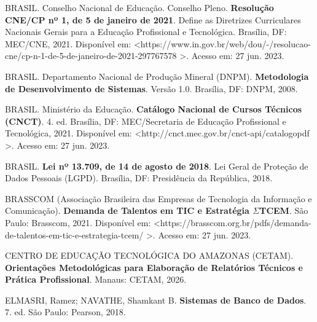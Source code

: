 \documentclass[12pt,a4paper]{article}
\begin{document}
\vspace{0.5cm}

\noindent BRASIL. Conselho Nacional de Educação. Conselho Pleno. \textbf{Resolução CNE/CP nº 1, de 5 de janeiro de 2021}. Define as Diretrizes Curriculares Nacionais Gerais para a Educação Profissional e Tecnológica. Brasília, DF: MEC/CNE, 2021. Disponível em: \textless https://www.in.gov.br/web/dou/-/resolucao-cne/cp-n-1-de-5-de-janeiro-de-2021-297767578 \textgreater. Acesso em: 27 jun. 2023.

\vspace{0.5cm}

\noindent BRASIL. Departamento Nacional de Produção Mineral (DNPM). \textbf{Metodologia de Desenvolvimento de Sistemas}. Versão 1.0. Brasília, DF: DNPM, 2008.

\vspace{0.5cm}

\noindent BRASIL. Ministério da Educação. \textbf{Catálogo Nacional de Cursos Técnicos (CNCT)}. 4. ed. Brasília, DF: MEC/Secretaria de Educação Profissional e Tecnológica, 2021. Disponível em: \textless http://cnct.mec.gov.br/cnct-api/catalogopdf \textgreater. Acesso em: 27 jun. 2023.

\vspace{0.5cm}

\noindent BRASIL. \textbf{Lei nº 13.709, de 14 de agosto de 2018}. Lei Geral de Proteção de Dados Pessoais (LGPD). Brasília, DF: Presidência da República, 2018.

\vspace{0.5cm}

\noindent BRASSCOM (Associação Brasileira das Empresas de Tecnologia da Informação e Comunicação). \textbf{Demanda de Talentos em TIC e Estratégia $\Sigma$TCEM}. São Paulo: Brasscom, 2021. Disponível em: \textless https://brasscom.org.br/pdfs/demanda-de-talentos-em-tic-e-estrategia-tcem/ \textgreater. Acesso em: 27 jun. 2023.

\vspace{0.5cm}

\noindent CENTRO DE EDUCAÇÃO TECNOLÓGICA DO AMAZONAS (CETAM). \textbf{Orientações Metodológicas para Elaboração de Relatórios Técnicos e Prática Profissional}. Manaus: CETAM, 2026.

\vspace{0.5cm}

\noindent ELMASRI, Ramez; NAVATHE, Shamkant B. \textbf{Sistemas de Banco de Dados}. 7. ed. São Paulo: Pearson, 2018.

\vspace{0.5cm}
\end{document}
